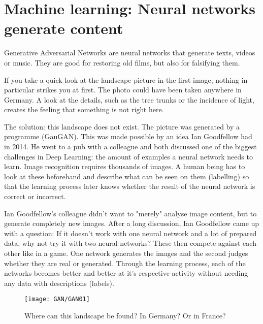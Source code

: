 %
%
%



\chapter{Machine learning: Neural networks generate content}

Generative Adversarial Networks are neural networks that generate texts, videos or music. They are good for restoring old films, but also for falsifying them.

If you take a quick look at the landscape picture in the first image, nothing in
particular strikes you at first. The photo could have been taken anywhere in Germany. A look at the details, such as the tree trunks or the incidence of light, creates the feeling that something is not right here. 

The solution: this landscape does not exist. The picture was generated by a programme (GauGAN). This was made possible by an idea Ian Goodfellow had in 2014. He went to a pub with a colleague and both discussed one of the biggest challenges in Deep Learning: the amount of examples a neural network needs to learn. Image recognition requires thousands of images. A human being has to look at these beforehand and describe what can be seen on them (labelling) so that the learning process later knows whether the result of the neural network is correct or incorrect.

Ian Goodfellow's colleague didn't want to "merely" analyse image content, but to generate completely new images. After a long discussion, Ian Goodfellow came up with a question: If it doesn't work with one neural network and a lot of prepared data, why not try it with two neural networks? These then compete against each other like in a game. One network generates the images and the second judges whether they are real or generated. Through the learning process, each of the networks becomes better and better at it's respective activity without needing any data with descriptions (labels).


\begin{figure}
	\texttt{[image: GAN/GAN01]}
	\caption{Where can this landscape be found? In Germany? Or in France?} 
	\label{GAN01}
\end{figure}


